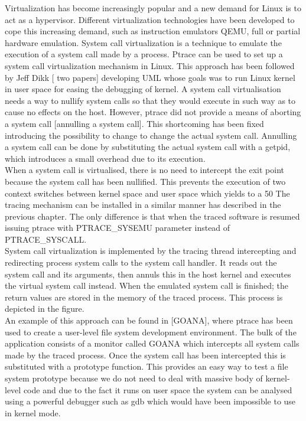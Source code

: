 Virtualization has become increasingly popular and a new demand for Linux is to act as a hypervisor. Different virtualization technologies have been developed to cope this increasing demand, such as instruction emulators QEMU, full or partial hardware emulation.  
System call virtualization is a technique to emulate the execution of a system call made by a process.
Ptrace can be used to set up a system call virtualization mechanism in Linux. This approach has been followed by Jeff Dikk [ two papers]  developing UML whose goals was to run Linux kernel in user space for easing the debugging of kernel.
A system call virtualisation needs a way to nullify system calls so that they would execute in such way as to cause no effects on the host.  However, ptrace did not provide a means of aborting a system call [annulling a system call].  This shortcoming has been fixed introducing the possibility to change to change the actual system call. Annulling a system call can be done by substituting the actual system call with a getpid, which introduces a small overhead due to its execution. \\
When a system call is virtualised, there is no need to intercept the exit point because the system call has been nullified.  This prevents the execution of two context switches between kernel space and user space which yields to a 50%
The tracing mechanism can be installed in a similar manner has described in the previous chapter. The only difference is that when the traced software is resumed issuing ptrace with PTRACE\_SYSEMU parameter instead of PTRACE\_SYSCALL.  \\
System call virtualization is implemented by the tracing thread intercepting and redirecting process system calls to the system call handler.  It reads out the system call and its arguments, then annuls this in the host kernel and executes the virtual system call instead. When the emulated system call is finished; the return values are stored in the memory of the traced process.
This process is depicted in the figure. \\
An example of this approach can be found in [GOANA], where ptrace has been used to create a user-level file system development environment.  The bulk of the application consists of a monitor called GOANA which intercepts all system calls made by the traced process. Once the system call has been intercepted this is substituted with a prototype function.  This provides an easy way to test a file system prototype because we do not need to deal with massive body of kernel-level code and  due to the fact it runs on user space the system can be analysed using a powerful debugger such as gdb which would have been impossible to use in kernel mode. \\
